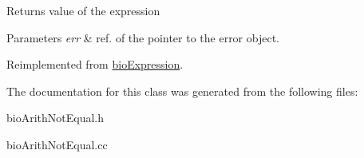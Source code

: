 \begin{DoxyReturn}{Returns}
value of the expression 
\end{DoxyReturn}

\begin{DoxyParams}{Parameters}
{\em err} & ref. of the pointer to the error object. \\
\hline
\end{DoxyParams}


Reimplemented from \hyperlink{classbio_expression_af58662a5d4d456f15bc4f2c9bd4f8a5b}{bio\+Expression}.



The documentation for this class was generated from the following files\+:\begin{DoxyCompactItemize}
\item 
bio\+Arith\+Not\+Equal.\+h\item 
bio\+Arith\+Not\+Equal.\+cc\end{DoxyCompactItemize}
